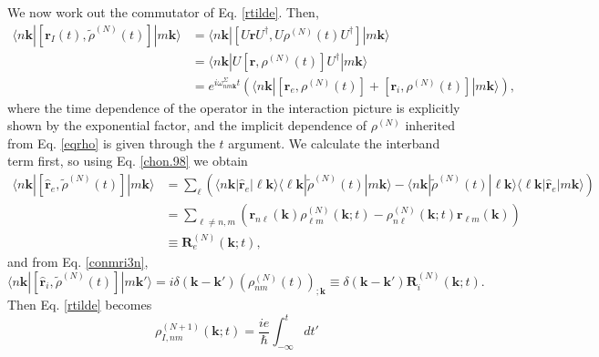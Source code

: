 {\color{red}
We now work out the commutator of Eq. \eqref{rtilde}. Then,
\begin{align}\label{conmu1}
\langle n\mathbf{k}|
\left[\mathbf{r}_{I}(t),\tilde{\rho}^{(N)}(t)\right]
|m\mathbf{k}\rangle
&= \langle n\mathbf{k}|
\left[U\mathbf{r}U^\dagger,U\rho^{(N)}(t)U^\dagger\right]
|m\mathbf{k}\rangle\nonumber \\
&= \langle n\mathbf{k}|
U\left[\mathbf{r},\rho^{(N)}(t)\right]U^\dagger
|m\mathbf{k}\rangle\\
&= e^{i\omega^\Sigma_{nm\mathbf{k}}t}
\left(
\langle n\mathbf{k}|
  \left[\mathbf{r}_{e},\rho^{(N)}(t)\right]
+ \left[\mathbf{r}_{i},\rho^{(N)}(t)\right]
|m\mathbf{k}\rangle
\right)\nonumber,
\end{align}
where the time dependence of the operator in the interaction picture is
explicitly shown by the exponential factor, and the implicit dependence of
$\rho^{(N)}$ inherited from Eq. \eqref{eqrho} is given through the $t$ argument.
We calculate the interband term first, so using Eq. \eqref{chon.98} we obtain
\begin{align}\label{conmu2}
\langle n\mathbf{k}|
[\hat{\mathbf{r}}_e,\tilde{\rho}^{(N)}(t)]
|m\mathbf{k}\rangle
&=
\sum_{\ell}
\left(
\langle n\mathbf{k}|
\hat{\mathbf{r}}_e
|\ell\mathbf{k}\rangle
\langle \ell\mathbf{k}|
\tilde{\rho}^{(N)}(t)
|m\mathbf{k}\rangle
-
\langle n\mathbf{k}|
\tilde{\rho}^{(N)}(t)
|\ell\mathbf{k}\rangle
\langle \ell\mathbf{k}|
\hat{\mathbf{r}}_e
|m\mathbf{k}\rangle
\right)
\nonumber \\
&=
\sum_{\ell\ne n,m}
\left(
\mathbf{r}_{n\ell}(\mathbf{k})
\rho^{(N)}_{\ell m}(\mathbf{k};t)
-
\rho^{(N)}_{n\ell}(\mathbf{k};t)
\mathbf{r}_{\ell m}(\mathbf{k})
\right)
\nonumber\\
&\equiv
\mathbf{R}^{(N)}_e(\mathbf{k};t)
,
\end{align}
and from Eq. \eqref{conmri3n},
\begin{equation}\label{conmri4}
\langle n\mathbf{k}|
[\hat{\mathbf{r}}_i,\tilde{\rho}^{(N)}(t)]
|m\mathbf{k}'\rangle
=i \delta(\mathbf{k}-\mathbf{k}') (\rho^{(N)}_{nm}(t))_{;\mathbf{k}}
\equiv \delta(\mathbf{k}-\mathbf{k}')\mathbf{R}_i^{(N)}(\mathbf{k};t).
\end{equation}
Then Eq. \eqref{rtilde} becomes
\begin{equation}\label{rtilde2}
\rho^{(N+1)}_{I,nm}(\mathbf{k};t)
=\frac{ie}{\hbar}\int_{-\infty}^t dt'

\end{equation}}
